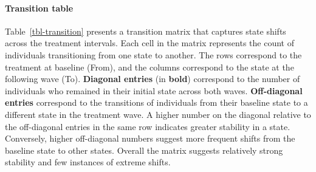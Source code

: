 \documentclass[
  singlecolumn]{article}
\let\oldparagraph\paragraph
\renewcommand{\paragraph}[1]{\oldparagraph{#1}\mbox{}}
\begin{document}
\paragraph{Transition table}\label{transition-table}

Table~\ref{tbl-transition} presents a transition matrix that captures
state shifts across the treatment intervals. Each cell in the matrix
represents the count of individuals transitioning from one state to
another. The rows correspond to the treatment at baseline (From), and
the columns correspond to the state at the following wave (To).
\textbf{Diagonal entries} (in \textbf{bold}) correspond to the number of
individuals who remained in their initial state across both waves.
\textbf{Off-diagonal entries} correspond to the transitions of
individuals from their baseline state to a different state in the
treatment wave. A higher number on the diagonal relative to the
off-diagonal entries in the same row indicates greater stability in a
state. Conversely, higher off-diagonal numbers suggest more frequent
shifts from the baseline state to other states. Overall the matrix
suggests relatively strong stability and few instances of extreme
shifts.
\end{document}
